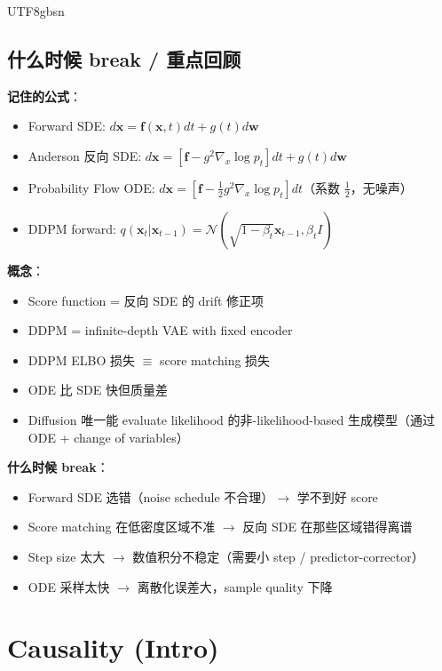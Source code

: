 \documentclass[11pt]{article}
\begin{document}
\begin{CJK}{UTF8}{gbsn}
\subsection{什么时候 break / 重点回顾}

\textbf{记住的公式}：
\begin{itemize}[nosep]
  \item Forward SDE: $d\mathbf{x} = \mathbf{f}(\mathbf{x}, t) dt + g(t) d\mathbf{w}$
  \item Anderson 反向 SDE: $d\mathbf{x} = [\mathbf{f} - g^2 \nabla_x \log p_t] dt + g(t) d\mathbf{w}$
  \item Probability Flow ODE: $d\mathbf{x} = [\mathbf{f} - \tfrac{1}{2} g^2 \nabla_x \log p_t] dt$（系数 $\tfrac{1}{2}$，无噪声）
  \item DDPM forward: $q(\mathbf{x}_t | \mathbf{x}_{t-1}) = \mathcal{N}(\sqrt{1 - \beta_t} \mathbf{x}_{t-1}, \beta_t I)$
\end{itemize}

\textbf{概念}：
\begin{itemize}[nosep]
  \item Score function = 反向 SDE 的 drift 修正项
  \item DDPM = infinite-depth VAE with fixed encoder
  \item DDPM ELBO 损失 $\equiv$ score matching 损失
  \item ODE 比 SDE 快但质量差
  \item Diffusion 唯一能 evaluate likelihood 的非-likelihood-based 生成模型（通过 ODE + change of variables）
\end{itemize}

\textbf{什么时候 break}：
\begin{itemize}[nosep]
  \item Forward SDE 选错（noise schedule 不合理）$\to$ 学不到好 score
  \item Score matching 在低密度区域不准 $\to$ 反向 SDE 在那些区域错得离谱
  \item Step size 太大 $\to$ 数值积分不稳定（需要小 step / predictor-corrector）
  \item ODE 采样太快 $\to$ 离散化误差大，sample quality 下降
\end{itemize}

\section{Causality (Intro)}


\end{CJK}
\end{document}
